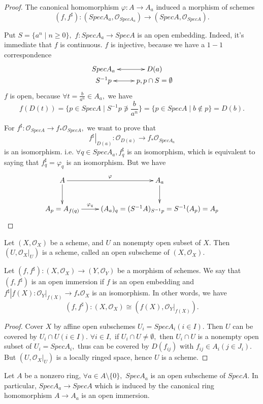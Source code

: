 \begin{proof}
The canonical homomorphism $\varphi:A\rightarrow A_a$ induced a
morphism of schemes $$(f,f^{\sharp}):(SpecA_a,\mathcal
{O}_{SpecA_a})\rightarrow(SpecA,\mathcal {O}_{SpecA}).$$

Put $S=\{a^n\mid n\geqslant 0\},$ $f:SpecA_a\rightarrow SpecA$ is an
open embedding. Indeed, it's immediate that $f$ is continuous. $f$
is injective, because we have a $1-1$ correspondence
\[ \xymatrix@R=0em{
   SpecA_a \ar@{<->}[r] & D(a)   \\
   S^{-1}p \ar@{<->}[r] & p,p\cap S=\emptyset }  \]
$f$ is open, because $\forall t=\frac{b}{a^n}\in A_a,$ we have
$$f(D(t))=\{p\in SpecA\mid S^{-1}p\not\ni\frac{b}{a^n}\}=\{p\in SpecA\mid b\not\in p\}=D(b).$$

For $f^{\sharp}:\mathcal {O}_{SpecA}\rightarrow f_{\ast}\mathcal
{O}_{SpecA},$ we want to prove that
$$\left.f^{\sharp}\right|_{D(a)}:\mathcal {O}_{D(a)}\rightarrow f_{\ast}\mathcal
{O}_{SpecA_a}$$ is an isomorphism. i.e. $\forall q\in SpecA_a,
f^{\sharp}_q$ is an isomorphism, which is equivalent to saying that
$f^{\sharp}_q=\varphi_q$ is an isomorphism. But we have
\[ \xymatrix{
   A \ar[r]^-{\varphi} \ar[d] & A_a \ar[d]                  \\
   {A_p=A_{f(q)}} \ar[r]^-{\varphi_q} &
   {(A_a)_q=(S^{-1}A)_{S^{-1}p}=S^{-1}(A_p)=A_p} }  \]
\end{proof}
\begin{cor}
Let $(X,\mathcal {O}_X)$ be a scheme, and $U$ an nonempty open
subset of $X.$ Then $(U, \left.\mathcal {O}_X\right|_U)$ is a
scheme, called an open subscheme of $(X,\mathcal {O}_X).$
\end{cor}
\begin{remark}
Let $(f,f^{\sharp}):(X,\mathcal {O}_X)\rightarrow (Y,\mathcal
{O}_Y)$ be a morphism of schemes. We say that $(f,f^{\sharp})$ is an
open immersion if $f$ is an open embedding and
$\left.f^{\sharp}\right|{f(X)}: \left.\mathcal
{O}_Y\right|_{f(X)}\rightarrow f_{\ast}\mathcal {O}_X$ is an
isomorphism. In other words, we have
$$(f,f^{\sharp}):(X,\mathcal {O}_X)\cong (f(X), \left.\mathcal {O}_Y\right|_{f(X)}).$$
\end{remark}
\begin{proof}
Cover $X$ by affine open subschemes $U_i=SpecA_i(i\in I).$ Then $U$
can be covered by $U_i\cap U(i\in I).$ $\forall i\in I,$ if $U_i\cap
U\neq\emptyset,$ then $U_i\cap U$ is a nonempty open subset of
$U_i=SpecA_i,$ thus can be covered by $D(f_{ij})$ with $f_{ij}\in
A_i(j\in J_i).$ But $(U, \left.\mathcal {O}_X\right|_U)$ is a
locally ringed space, hence $U$ is a scheme.
\end{proof}
\begin{eg}
Let $A$ be a nonzero ring, $\forall a\in A\setminus \{0\},$
$SpecA_a$ is an open subscheme of $SpecA.$ In particular,
$SpecA_a\rightarrow SpecA$ which is induced by the canonical ring
homomorphism $A\rightarrow A_a$ is an open immersion.
\end{eg}


